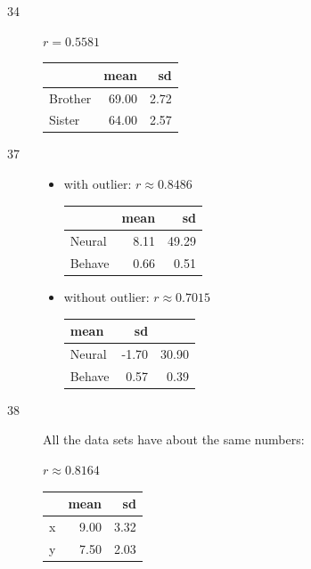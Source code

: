 \documentclass[letterpaper, landscape]{exam}
\begin{document}
    \begin{description}
      \item[34] $r = 0.5581$

        \begin{tabular}{lrr}
          \toprule
                  & mean  & sd \\
          \midrule
          Brother & 69.00 & 2.72 \\
          Sister  & 64.00 & 2.57 \\
          \bottomrule
        \end{tabular}

      \item[37]
        \begin{itemize}
          \item with outlier: $r \approx 0.8486$

            \begin{tabular}{lrr}
              \toprule
                     & mean & sd \\
              \midrule
              Neural & 8.11 & 49.29 \\
              Behave & 0.66 & 0.51 \\
              \bottomrule
            \end{tabular}

          \item without outlier: $r \approx 0.7015$

            \begin{tabular}{lrr}
              \toprule
              mean   & sd \\
              \midrule
              Neural & -1.70 & 30.90 \\
              Behave & 0.57  & 0.39 \\
              \bottomrule
            \end{tabular}

        \end{itemize}

      \item[38]
        All the data sets have about the same numbers:

        $r \approx 0.8164$

        \begin{tabular}{lrr}
          \toprule
            & mean & sd \\
          \midrule
          x & 9.00 & 3.32 \\
          y & 7.50 & 2.03 \\
          \bottomrule
        \end{tabular}


\end{description}
\end{document}
